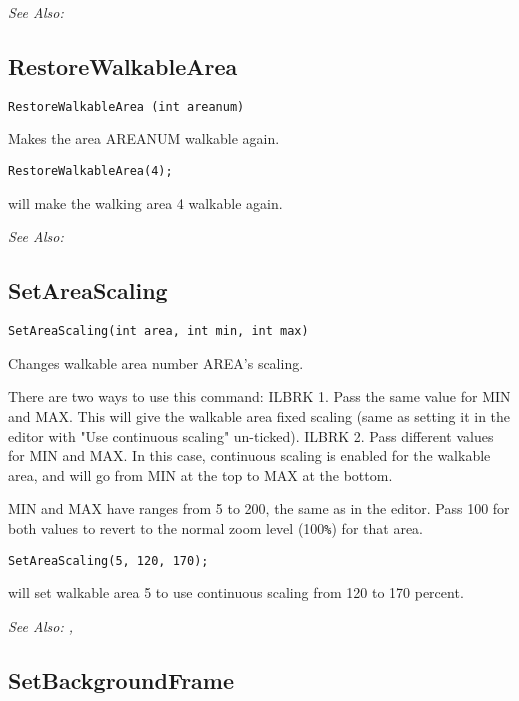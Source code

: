 \it{See Also:} 


\subsection{RestoreWalkableArea}\label{RestoreWalkableArea}%

\begin{verbatim}
RestoreWalkableArea (int areanum)
\end{verbatim}
Makes the area AREANUM walkable again.

\begin{verbatim}
RestoreWalkableArea(4);
\end{verbatim}
will make the walking area 4 walkable again.

\it{See Also:} 


\subsection{SetAreaScaling}\label{SetAreaScaling}%

\begin{verbatim}
SetAreaScaling(int area, int min, int max)
\end{verbatim}
Changes walkable area number AREA's scaling.

There are two ways to use this command: ILBRK
1. Pass the same value for MIN and MAX. This will give the walkable area fixed
scaling (same as setting it in the editor with "Use continuous scaling" un-ticked). ILBRK
2. Pass different values for MIN and MAX. In this case, continuous scaling is
enabled for the walkable area, and will go from MIN at the top to MAX at the bottom.

MIN and MAX have ranges from 5 to 200, the same as in the editor. Pass 100 for both values
to revert to the normal zoom level (100\verb$%$) for that area.

\begin{verbatim}
SetAreaScaling(5, 120, 170);
\end{verbatim}
will set walkable area 5 to use continuous scaling from 120 to 170 percent.

\it{See Also:} , 


\subsection{SetBackgroundFrame}\label{SetBackgroundFrame}%


